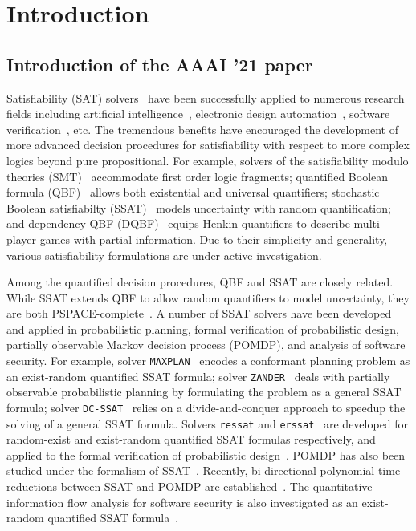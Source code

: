 \chapter{Introduction}
\label{chap:introduction}

\section{Introduction of the AAAI '21 paper}
Satisfiability (SAT) solvers~\cite{SATHandbook} have been successfully applied to numerous research fields including artificial intelligence~\cite{Nilsson2014,Russell2020}, electronic design automation~\cite{Marques2000,Wang2009}, software verification~\cite{Jhala2009, Berard2013}, etc.
The tremendous benefits have encouraged the development of more advanced decision procedures for satisfiability with respect to more complex logics beyond pure propositional.
For example, solvers of the satisfiability modulo theories (SMT)~\cite{Moura2011,HBMC-SMT} accommodate first order logic fragments; quantified Boolean formula (QBF)~\cite{Narizzano2006,SATHandbook-QBF} allows both existential and universal quantifiers; stochastic Boolean satisfiabilty (SSAT)~\cite{Littman2001,SATHandbook-SSAT} models uncertainty with random quantification; and dependency QBF (DQBF)~\cite{Balabanov2014,Scholl2018} equips Henkin quantifiers to describe multi-player games with partial information.
Due to their simplicity and generality, various satisfiability formulations are under active investigation.


Among the quantified decision procedures, QBF and SSAT are closely related.
While SSAT extends QBF to allow random quantifiers to model uncertainty, they are both PSPACE-complete~\cite{Stockmeyer1973}.
A number of SSAT solvers have been developed and applied in probabilistic planning, formal verification of probabilistic design, partially observable Markov decision process (POMDP), and analysis of software security.
For example, solver \texttt{MAXPLAN}~\cite{Majercik1998} encodes a conformant planning problem as an exist-random quantified SSAT formula; solver \texttt{ZANDER}~\cite{Majercik2003} deals with partially observable probabilistic planning by formulating the problem as a general SSAT formula; solver \texttt{DC-SSAT}~\cite{Majercik2005} relies on a divide-and-conquer approach to speedup the solving of a general SSAT formula.
Solvers \texttt{ressat} and \texttt{erssat}~\cite{LeeIJCAI17RESSAT,LeeIJCAI18ERSSAT} are developed for random-exist and exist-random quantified SSAT formulas respectively, and applied to the formal verification of probabilistic design~\cite{LeeTC18ProbDesign}.
POMDP has also been studied under the formalism of SSAT~\cite{Majercik2004,Salmon2020}.
Recently, bi-directional polynomial-time reductions between SSAT and POMDP are established~\cite{Salmon2020}.
The quantitative information flow analysis for software security is also investigated as an exist-random quantified SSAT formula~\cite{Fremont2017}.

